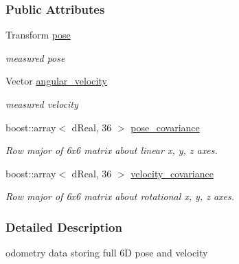 \subsubsection*{Public Attributes}
\begin{DoxyCompactItemize}
\item 
\hypertarget{classOpenRAVE_1_1SensorBase_1_1OdometrySensorData_a8f2914bb40240947a032e59e34e22176}{
Transform \hyperlink{classOpenRAVE_1_1SensorBase_1_1OdometrySensorData_a8f2914bb40240947a032e59e34e22176}{pose}}
\label{classOpenRAVE_1_1SensorBase_1_1OdometrySensorData_a8f2914bb40240947a032e59e34e22176}

\begin{DoxyCompactList}\small\item\em measured pose \item\end{DoxyCompactList}\item 
\hypertarget{classOpenRAVE_1_1SensorBase_1_1OdometrySensorData_ae8613d4f99e7dfc62e3c0e59492019ef}{
Vector \hyperlink{classOpenRAVE_1_1SensorBase_1_1OdometrySensorData_ae8613d4f99e7dfc62e3c0e59492019ef}{angular\_\-velocity}}
\label{classOpenRAVE_1_1SensorBase_1_1OdometrySensorData_ae8613d4f99e7dfc62e3c0e59492019ef}

\begin{DoxyCompactList}\small\item\em measured velocity \item\end{DoxyCompactList}\item 
\hypertarget{classOpenRAVE_1_1SensorBase_1_1OdometrySensorData_a31ce3f9136d6982a724ec36ef330f43e}{
boost::array$<$ dReal, 36 $>$ \hyperlink{classOpenRAVE_1_1SensorBase_1_1OdometrySensorData_a31ce3f9136d6982a724ec36ef330f43e}{pose\_\-covariance}}
\label{classOpenRAVE_1_1SensorBase_1_1OdometrySensorData_a31ce3f9136d6982a724ec36ef330f43e}

\begin{DoxyCompactList}\small\item\em Row major of 6x6 matrix about linear x, y, z axes. \item\end{DoxyCompactList}\item 
\hypertarget{classOpenRAVE_1_1SensorBase_1_1OdometrySensorData_acd0be57994abcabd2a851a9adc4c6933}{
boost::array$<$ dReal, 36 $>$ \hyperlink{classOpenRAVE_1_1SensorBase_1_1OdometrySensorData_acd0be57994abcabd2a851a9adc4c6933}{velocity\_\-covariance}}
\label{classOpenRAVE_1_1SensorBase_1_1OdometrySensorData_acd0be57994abcabd2a851a9adc4c6933}

\begin{DoxyCompactList}\small\item\em Row major of 6x6 matrix about rotational x, y, z axes. \item\end{DoxyCompactList}\end{DoxyCompactItemize}


\subsubsection{Detailed Description}
odometry data storing full 6D pose and velocity 